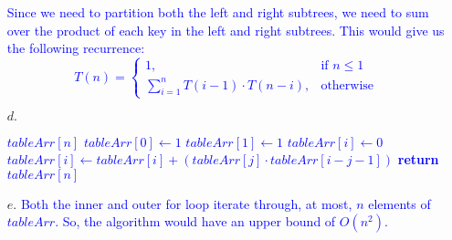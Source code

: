 \documentclass[11pt]{article}
\begin{document}
\begin{itemize}
\textcolor{blue}{
Since we need to partition both the left and right subtrees, we need to sum over the product of each key in the left and right subtrees. This would give us the following recurrence: 
$$\boxed{{\displaystyle T(n)={
\begin{cases}{1},&{\text{if }} n \leq 1\\ \sum_{i=1}^{n} T(i-1) \cdot T(n-i),&{\text{otherwise}}
\end{cases}}}}$$
}
\item[$d.$]
\textcolor{blue}{
\begin{algorithmic}[1]
	\State $tableArr[n]$ 
	\State $tableArr[0] \gets 1$
	\State $tableArr[1] \gets 1$
		\State $tableArr[i] \gets 0$
			\State $tableArr[i] \gets tableArr[i] + (tableArr[j] \cdot tableArr[i - j -1])$
		\EndFor
	\EndFor
	\State \textbf{return} $tableArr[n]$
\EndFunction
\end{algorithmic}
}
\item[$e.$]
\textcolor{blue}{
Both the inner and outer for loop iterate through, at most, $n$ elements of $tableArr$. So, the algorithm would have an upper bound of $\boxed{O(n^2)}$.
}



\end{itemize}
\end{document}
